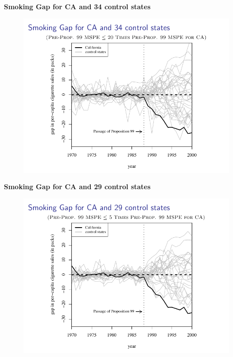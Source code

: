 \documentclass[notes=show]{beamer}
\begin{document}
\begin{frame}[plain]
	\begin{center}
	\textbf{Smoking Gap for CA and 34 control states}
	\end{center}
	
	\begin{figure}
	\includegraphics[scale=0.75]{./lecture_includes/abadie_8.pdf}
	\end{figure}
\end{frame}

\begin{frame}[plain]
	\begin{center}
	\textbf{Smoking Gap for CA and 29 control states}
	\end{center}
	
	\begin{figure}
	\includegraphics[scale=0.75]{./lecture_includes/abadie_9.pdf}
	\end{figure}
\end{frame}
\end{document}
